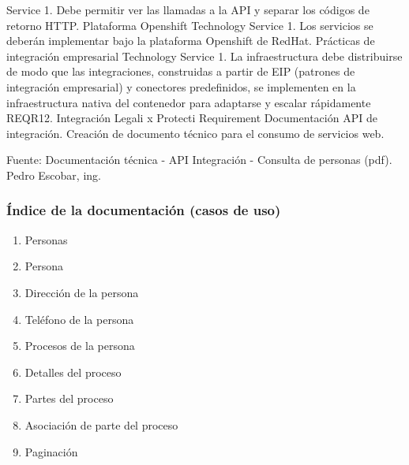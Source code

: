 \documentclass[
  paper=a4,
  ,captions=tableheading
]{scrartcl}
\providecommand{\tightlist}{%
  \setlength{\itemsep}{0pt}\setlength{\parskip}{0pt}}
\begin{document}
Service \textbar{} 1. Debe permitir ver las llamadas a la API y separar
los códigos de retorno HTTP. \textbar{} \textbar{} Plataforma Openshift
\textbar{} Technology Service \textbar{} 1. Los servicios se deberán
implementar bajo la plataforma Openshift de RedHat. \textbar{}
\textbar{} Prácticas de integración empresarial \textbar{} Technology
Service \textbar{} 1. La infraestructura debe distribuirse de modo que
las integraciones, construidas a partir de EIP (patrones de integración
empresarial) y conectores predefinidos, se implementen en la
infraestructura nativa del contenedor para adaptarse y escalar
rápidamente \textbar{} \textbar{} REQR12. Integración Legali x Protecti
\textbar{} Requirement \textbar{} Documentación API de integración.
Creación de documento técnico para el consumo de servicios web.

Fuente: Documentación técnica - API Integración - Consulta de personas
(pdf). Pedro Escobar, ing.

\subsubsection{Índice de la documentación (casos de
uso)}\label{sec:uxedndice-de-la-documentaciuxf3n-casos-de-uso-1}

\begin{enumerate}
\def\labelenumi{\arabic{enumi}.}
\tightlist
\item
  Personas
\item
  Persona
\item
  Dirección de la persona
\item
  Teléfono de la persona
\item
  Procesos de la persona
\item
  Detalles del proceso
\item
  Partes del proceso
\item
  Asociación de parte del proceso
\item
  Paginación
\end{enumerate}
\end{document}

